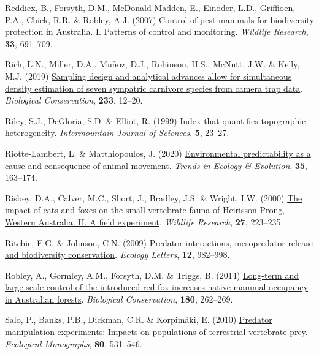 \documentclass[preprint, 3p, authoryear]{elsarticle} %
\newlength{\cslhangindent}
\newlength{\cslentryspacingunit} %
\newenvironment{CSLReferences}[2] %
 {%
  \setlength{\parindent}{0pt}
  \ifodd #1
  \let\oldpar\par
  \def\par{\hangindent=\cslhangindent\oldpar}
  \fi
  \setlength{\parskip}{#2\cslentryspacingunit}
 }%
 {}
\begin{document}
\begin{CSLReferences}{1}{0}
\leavevmode{}%
Reddiex, B., Forsyth, D.M., McDonald-Madden, E., Einoder, L.D., Griffioen, P.A., Chick, R.R. \& Robley, A.J. (2007) \href{https://doi.org/10.1071/WR05102}{Control of pest mammals for biodiversity protection in {{A}ustralia}. I. Patterns of control and monitoring}. \emph{Wildlife Research}, \textbf{33}, 691--709.

\leavevmode{}%
Rich, L.N., Miller, D.A., Muñoz, D.J., Robinson, H.S., McNutt, J.W. \& Kelly, M.J. (2019) \href{https://doi.org/10.1016/j.biocon.2019.02.018}{Sampling design and analytical advances allow for simultaneous density estimation of seven sympatric carnivore species from camera trap data}. \emph{Biological Conservation}, \textbf{233}, 12--20.

\leavevmode{}%
Riley, S.J., DeGloria, S.D. \& Elliot, R. (1999) Index that quantifies topographic heterogeneity. \emph{Intermountain Journal of Sciences}, \textbf{5}, 23--27.

\leavevmode{}%
Riotte-Lambert, L. \& Matthiopoulos, J. (2020) \href{https://doi.org/10.1016/j.tree.2019.09.009}{Environmental predictability as a cause and consequence of animal movement}. \emph{Trends in Ecology \& Evolution}, \textbf{35}, 163--174.

\leavevmode{}%
Risbey, D.A., Calver, M.C., Short, J., Bradley, J.S. \& Wright, I.W. (2000) \href{https://doi.org/10.1071/WR98092}{The impact of cats and foxes on the small vertebrate fauna of {Heirisson Prong, Western {A}ustralia. II. A} field experiment}. \emph{Wildlife Research}, \textbf{27}, 223--235.

\leavevmode{}%
Ritchie, E.G. \& Johnson, C.N. (2009) \href{https://doi.org/10.1111/j.1461-0248.2009.01347.x}{Predator interactions, mesopredator release and biodiversity conservation}. \emph{Ecology Letters}, \textbf{12}, 982--998.

\leavevmode{}%
Robley, A., Gormley, A.M., Forsyth, D.M. \& Triggs, B. (2014) \href{https://doi.org/10.1016/j.biocon.2014.10.017}{Long-term and large-scale control of the introduced red fox increases native mammal occupancy in {{A}ustralian} forests}. \emph{Biological Conservation}, \textbf{180}, 262--269.

\leavevmode{}%
Salo, P., Banks, P.B., Dickman, C.R. \& Korpimäki, E. (2010) \href{https://doi.org/10.1890/09-1260.1}{Predator manipulation experiments: Impacts on populations of terrestrial vertebrate prey}. \emph{Ecological Monographs}, \textbf{80}, 531--546.


\end{CSLReferences}
\end{document}
